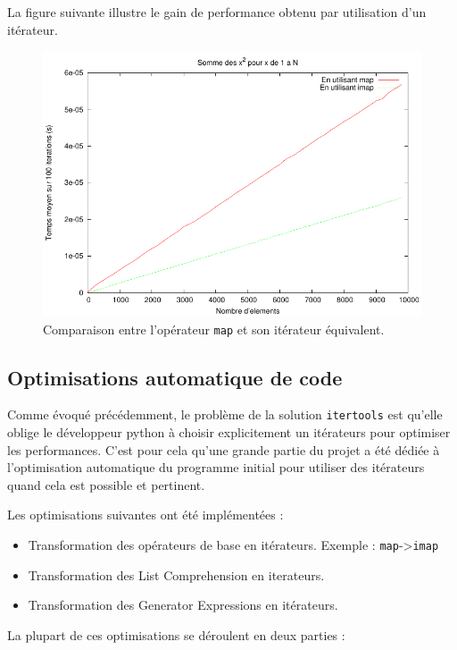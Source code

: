 \documentclass[a4paper]{article}
\begin{document}
La figure suivante illustre le gain de performance obtenu par
utilisation d'un itérateur.

\begin{figure}[h!]
  \includegraphics[width=\textwidth]{MapImap}
  \caption{Comparaison entre l'opérateur \texttt{map} et son itérateur équivalent.}
\end{figure}


\subsection*{Optimisations automatique de code}

Comme évoqué précédemment, le problème de la solution \texttt{itertools} est
qu'elle oblige le développeur python à choisir explicitement un
itérateurs pour optimiser les performances. C'est pour cela qu'une
grande partie du projet a été dédiée à l'optimisation automatique du
programme initial pour utiliser des itérateurs quand cela est possible
et pertinent.

Les optimisations suivantes ont été implémentées :

\begin{itemize}
\item Transformation des opérateurs de base en itérateurs. Exemple :
  \texttt{map}->\texttt{imap}
\item Transformation des List Comprehension en iterateurs.
\item Transformation des Generator Expressions en itérateurs.
\end{itemize}

La plupart de ces optimisations se déroulent en deux parties :
\end{document}
